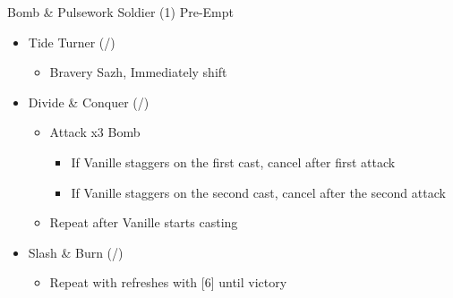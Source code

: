 \renewcommand{\first}{[1] Slash \& Burn (\com/\rav)}
\renewcommand{\second}{[2] Tide Turner (\syn/\sab)}
\renewcommand{\third}{[3] Divide \& Conquer (\com/\sab)}
\renewcommand{\fourth}{[4] Dualcasting (\rav/\rav)}
\renewcommand{\fifth}{[5] Undermine (\rav/\sab)}
\renewcommand{\sixth}{[6] Slash \& Burn (\com/\rav)}



\begin{battle}{Bomb \& Pulsework Soldier (1) Pre-Empt}
\begin{itemize}
    \item \second
    \begin{itemize}
        \item Bravery Sazh, Immediately shift
    \end{itemize}
    \item \third
    \begin{itemize}
        \item Attack x3 Bomb
        \begin{itemize}
            \item If Vanille staggers on the first cast, cancel after first attack
            \item If Vanille staggers on the second cast, cancel after the second attack
        \end{itemize}
        \item Repeat after Vanille starts casting
    \end{itemize}
    \item \first
    \begin{itemize}
        \item Repeat with refreshes with [6] until victory
    \end{itemize}
\end{itemize}
\end{battle}

